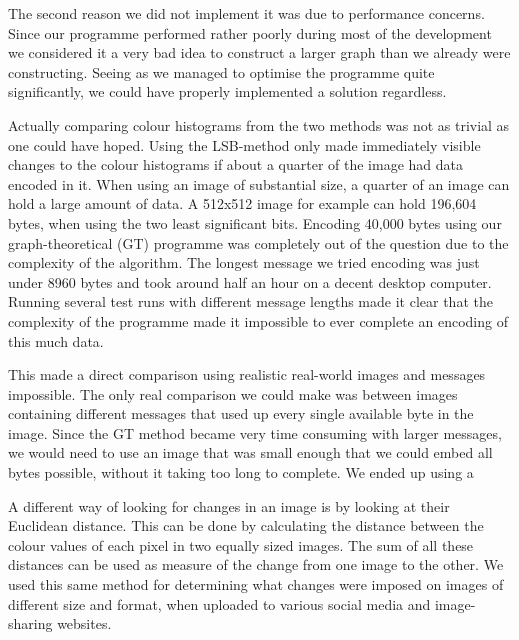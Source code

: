 The second reason we did not implement it was due to performance concerns.
Since our programme performed rather poorly during most of the development we considered it a very bad idea to construct a larger graph than we already were constructing.
Seeing as we managed to optimise the programme quite significantly, we could have properly implemented a solution regardless.

Actually comparing colour histograms from the two methods was not as trivial as one could have hoped.
Using the LSB-method only made immediately visible changes to the colour histograms if about a quarter of the image had data encoded in it.
When using an image of substantial size, a quarter of an image can hold a large amount of data. 
A 512x512 image for example can hold 196,604 bytes, when using the two least significant bits.
Encoding 40,000 bytes using our graph-theoretical (GT) programme was completely out of the question due to the complexity of the algorithm.
The longest message we tried encoding was just under 8960 bytes and took around half an hour on a decent desktop computer.
Running several test runs with different message lengths made it clear that the complexity of the programme made it impossible to ever complete an encoding of this much data.

This made a direct comparison using realistic real-world images and messages impossible. 
The only real comparison we could make was between images containing different messages that used up every single available byte in the image.
Since the GT method became very time consuming with larger messages, we would need to use an image that was small enough that we could embed all bytes possible, without it taking too long to complete.
We ended up using a


A different way of looking for changes in an image is by looking at their Euclidean distance.
This can be done by calculating the distance between the colour values of each pixel in two equally sized images.
The sum of all these distances can be used as measure of the change from one image to the other.
We used this same method for determining what changes were imposed on images of different size and format, when uploaded to various social media and image-sharing websites.

